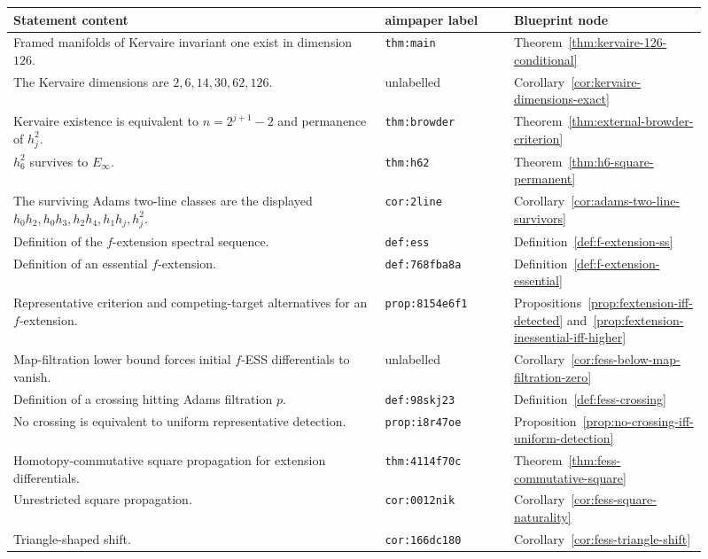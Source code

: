 \begin{center}
\scriptsize
\begin{tabular}{p{0.49\linewidth}p{0.17\linewidth}p{0.25\linewidth}}
\textbf{Statement content} & \textbf{aimpaper label} & \textbf{Blueprint node} \\
\hline
Framed manifolds of Kervaire invariant one exist in dimension $126$. & \texttt{thm:main} & Theorem~\ref{thm:kervaire-126-conditional} \\
The Kervaire dimensions are $2,6,14,30,62,126$. & unlabelled & Corollary~\ref{cor:kervaire-dimensions-exact} \\
Kervaire existence is equivalent to $n=2^{j+1}-2$ and permanence of $h_j^2$. & \texttt{thm:browder} & Theorem~\ref{thm:external-browder-criterion} \\
$h_6^2$ survives to $E_\infty$. & \texttt{thm:h62} & Theorem~\ref{thm:h6-square-permanent} \\
The surviving Adams two-line classes are the displayed $h_0h_2,h_0h_3,h_2h_4,h_1h_j,h_j^2$. & \texttt{cor:2line} & Corollary~\ref{cor:adams-two-line-survivors} \\
Definition of the $f$-extension spectral sequence. & \texttt{def:ess} & Definition~\ref{def:f-extension-ss} \\
Definition of an essential $f$-extension. & \texttt{def:768fba8a} & Definition~\ref{def:f-extension-essential} \\
Representative criterion and competing-target alternatives for an $f$-extension. & \texttt{prop:8154e6f1} & Propositions~\ref{prop:fextension-iff-detected} and~\ref{prop:fextension-inessential-iff-higher} \\
Map-filtration lower bound forces initial $f$-ESS differentials to vanish. & unlabelled & Corollary~\ref{cor:fess-below-map-filtration-zero} \\
Definition of a crossing hitting Adams filtration $p$. & \texttt{def:98skj23} & Definition~\ref{def:fess-crossing} \\
No crossing is equivalent to uniform representative detection. & \texttt{prop:i8r47oe} & Proposition~\ref{prop:no-crossing-iff-uniform-detection} \\
Homotopy-commutative square propagation for extension differentials. & \texttt{thm:4114f70c} & Theorem~\ref{thm:fess-commutative-square} \\
Unrestricted square propagation. & \texttt{cor:0012nik} & Corollary~\ref{cor:fess-square-naturality} \\
Triangle-shaped shift. & \texttt{cor:166dc180} & Corollary~\ref{cor:fess-triangle-shift} \\

\end{tabular}
\end{center}
